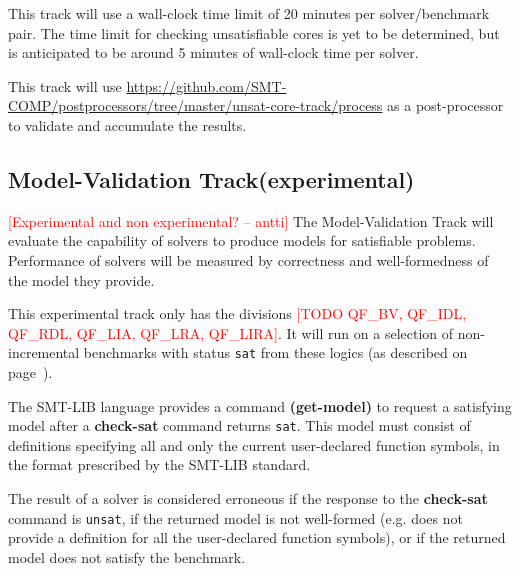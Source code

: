 \documentclass[12pt]{article}
\newcommand{\akey}[1]{\textbf{#1}\xspace}
\newcommand{\rem}[1]{\textcolor{red}{[#1]}}
\newcommand{\todo}[1]{\rem{TODO #1}}
\newcommand{\ah}[1]{\rem{#1 -- antti}}
\newcommand{\mvaltrack}{Model-Validation Track\xspace}
\begin{document}
This track will use a wall-clock time limit of 20 minutes per solver/benchmark
pair. The time limit for checking unsatisfiable cores is yet to be determined,
but is anticipated to be around 5 minutes of wall-clock time per solver.

This track will use
{\url{https://github.com/SMT-COMP/postprocessors/tree/master/unsat-core-track/process}}
as a post-processor
to validate and accumulate the results.

\subsection{\mvaltrack (experimental)}\ah{Experimental and non
experimental?}
\label{sec:exec:model}
The \mvaltrack will evaluate the capability of solvers to produce models for
satisfiable problems.  Performance of solvers will be measured by correctness
and well-formedness of the model they provide.

This experimental track only has the divisions
\todo{QF\_BV, QF\_IDL, QF\_RDL, QF\_LIA, QF\_LRA, QF\_LIRA}. It will run on a
selection of non-incremental benchmarks with status \texttt{sat} from these
logics (as described on page~\pageref{benchmark-selection}).

The SMT-LIB language provides a command \akey{(get-model)} to request a
satisfying model after a \akey{check-sat} command returns \texttt{sat}.  This
model must consist of definitions specifying all and only the current
user-declared function symbols, in the format prescribed by the SMT-LIB
standard.

The result of a solver is considered erroneous if the response to the
\akey{check-sat} command is \texttt{unsat}, if the returned model is not
well-formed (e.g. does not provide a definition for all the user-declared
function symbols), or if the returned model does not satisfy the benchmark.
\end{document}
